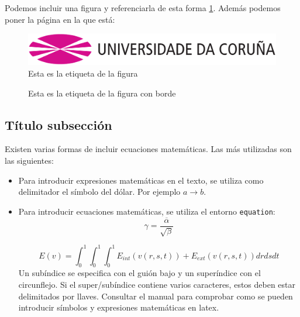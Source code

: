 Podemos incluir una figura y referenciarla de esta forma \ref{fig:logo}. Además podemos poner la página en la que está: \pageref{fig:logo}

\begin{figure}[htp]
\begin{center}
\includegraphics[scale=0.2]{figures/logo.eps}
\caption{Esta es la etiqueta de la figura}
\label{fig:logo}
\end{center}
\end{figure}


\begin{figure}[htp]
\begin{center}
\caption{Esta es la etiqueta de la figura con borde}
\label{fig:logo2}
\end{center}
\end{figure}


\subsection{Título subsección}

Existen varias formas de incluir ecuaciones matemáticas. Las más utilizadas son las siguientes:
\begin{itemize}
 \item Para introducir expresiones matemáticas en el texto, se utiliza como delimitador el símbolo del dólar. Por ejemplo $a \rightarrow b$.
 \item Para introducir ecuaciones matemáticas, se utiliza el entorno \texttt{equation}:
\begin{equation}
 \gamma = \frac{\overline{\alpha}}{\sqrt{\beta}}
\label{eq:equation_example_1}
\end{equation}

\begin{equation}
E(v) =  \int^1_0 \int^1_0 \int^1_0 E_{int}(v(r,s,t)) + E_{ext}(v(r,s,t))drdsdt 
\label{eq:equation_example_2}
\end{equation}	
Un subíndice se especifica con el guión bajo y un superíndice con el circunflejo. Si el super/subíndice contiene varios caracteres, estos deben estar delimitados por llaves. Consultar el manual para comprobar como se pueden introducir símbolos y expresiones matemáticas en latex.
\end{itemize}



